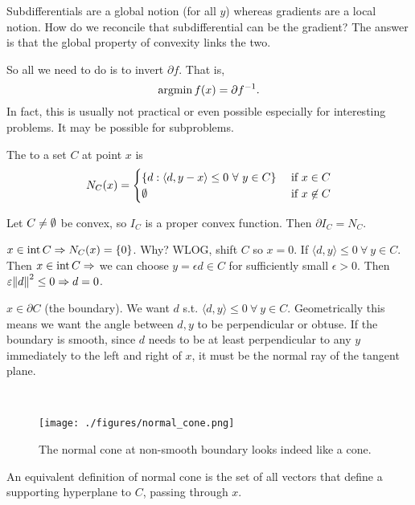 \documentclass[class=article,crop=false]{standalone}
\begin{document}
\begin{remark}
	Subdifferentials are a global notion (for all $ y$) whereas gradients are a local notion. How do we reconcile that subdifferential can be the gradient? The answer is that the global property of convexity links the two.
\end{remark}
\begin{remark}
So all we need to do is to invert $ \partial f$. That is,
 \[
	 \operatorname*{argmin} f(x) = \partial f^{-1}
.\]
In fact, this is usually not practical or even possible especially for interesting problems. It may be possible for subproblems.
\end{remark}
\begin{defn}
The  to a set $ C$ at point  $ x$ is
\begin{equation*}
	N_C(x)=
\begin{cases}
	\{d: \langle d,y-x \rangle \leq 0 \ \forall \ y \in C\} & \text{ if } x \in C\\
	\emptyset & \text{ if } x \not\in C 
\end{cases}
\end{equation*}
\end{defn}
\begin{eg}
Let $ C \neq \emptyset$ be convex, so $ I_C$ is a proper convex function. Then  $ \partial I_C = N_C$.
\end{eg}
\begin{eg}
	$ x \in \operatorname{int} C \Rightarrow N_C(x) = \{0\} $. Why? WLOG, shift $ C$ so  $ x=0$. If  $ \langle d,y \rangle\leq 0 \ \forall \ y \in C$. Then $ x \in \operatorname{int} C \Rightarrow$ we can choose $y = \epsilon d \in C$ for sufficiently small $ \epsilon >0$. Then $ \varepsilon {\left\lVert{ d}\right\rVert}^2 \leq 0 \Rightarrow d=0 $.
\end{eg}
\begin{eg}
	$ x \in \partial C$ (the boundary). We want $ d$  s.t. $ \langle d,y \rangle\leq 0 \ \forall \ y \in C$. Geometrically this means we want the angle between $ d,y$ to be perpendicular or obtuse. If the boundary is smooth, since  $ d$ needs to be at least perpendicular to any  $ y$ immediately to the left and right of  $ x$, it must be the normal ray of the tangent plane.
\end{eg}

\begin{eg}
	~\begin{figure}[H]
		\centering
		\texttt{[image: ./figures/normal\_cone.png]}
		\caption{The normal cone at non-smooth boundary looks indeed like a cone.}
	\end{figure}
\end{eg}
\begin{remark}
An equivalent definition of normal cone is the set of all vectors that define a supporting hyperplane to $ C$, passing through  $ x$.
\end{remark}
\end{document}
